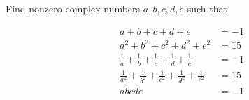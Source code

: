 Find nonzero complex numbers $a, b, c, d, e$ such that

$$
\begin{aligned}
                                                            a + b + c + d + e & = -1 \\
                                                  a^2 + b^2 + c^2 + d^2 + e^2 & = 15 \\
          \frac{1}{a} + \frac{1}{b} + \frac{1}{c} + \frac{1}{d} + \frac{1}{e} & = -1 \\
\frac{1}{a^2} + \frac{1}{b^2} + \frac{1}{c^2} + \frac{1}{d^2} + \frac{1}{e^2} & = 15 \\
                                                                        abcde & = -1
\end{aligned}
$$
